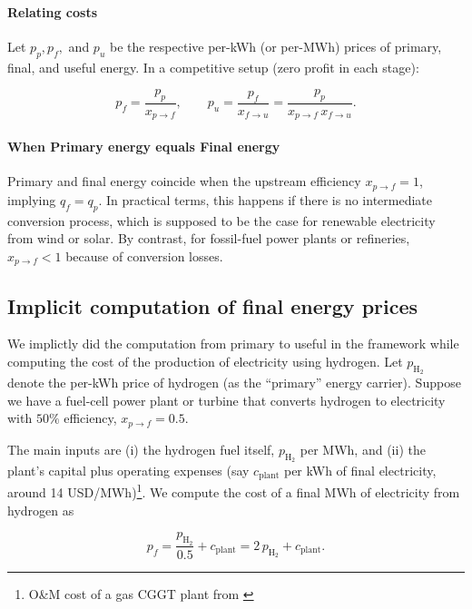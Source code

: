 \paragraph{Relating costs} Let $p_p, p_f,$ and $p_u$ be the respective per-kWh (or per-MWh) prices of primary, final, and useful energy. In a competitive setup (zero profit in each stage):

\begin{equation*}
     p_f 
    = \frac{p_p}{x_{p\to f}},
  \quad\quad
  p_u 
    = \frac{p_f}{x_{f\to u}}
          = \frac{p_p}{x_{p\to f}\,x_{f\to u}}.
\end{equation*}


\paragraph{When Primary energy equals Final energy} Primary and final energy coincide when the upstream efficiency $x_{p\to f} = 1$, implying $q_f = q_p$.  In practical terms, this happens if there is no intermediate conversion process, which is supposed to be the case for renewable electricity from wind or solar. By contrast, for fossil-fuel power plants or refineries, $x_{p\to f} < 1$ because of conversion losses.



\subsection{Implicit computation of final energy prices}

We implictly did the computation from primary to useful in the framework while computing the cost of the production of electricity using hydrogen. Let $p_{\mathrm{H_2}}$ denote the per-kWh price of hydrogen (as the ``primary'' energy carrier). Suppose we have a fuel-cell power plant or turbine that converts hydrogen to electricity with $50\%$ efficiency, $x_{p \to f} = 0.5$. 

The main inputs are (i) the hydrogen fuel itself, $p_{\mathrm{H_2}}$ per MWh, and (ii) the plant's capital plus operating expenses (say $c_{\mathrm{plant}}$ per kWh of final electricity, around 14 USD/MWh)\footnote{O\&M cost of a gas CGGT plant from \cite{beisElectricityGenerationCost2020}}. We  compute the cost of a final MWh of electricity from hydrogen as


\begin{equation*}
     p_f
        = \frac{p_{\mathrm{H_2}}}{0.5}
        + c_{\mathrm{plant}}
        = 2\,p_{\mathrm{H_2}} + c_{\mathrm{plant}}.
\end{equation*}

